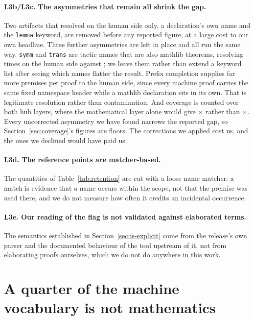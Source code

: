 \paragraph{L3b/L3c. The asymmetries that remain all shrink the gap.} Two
artifacts that resolved on the human side only, a declaration's own name
and the \texttt{lemma} keyword, are removed before any reported figure, at a
large cost to our own headline. Three further asymmetries are
left in place and all run the same way. \texttt{symm} and \texttt{trans} are
tactic names that are also mathlib theorems, resolving \symmTransHuman{} times
on the human side against
\symmTransMachine{}; we leave
them rather than extend a keyword list after seeing which names flatter the
result. Prefix completion supplies far more premises per proof to the human
side,
since every machine proof carries the same fixed namespace header while a
mathlib declaration sits in its own. That is legitimate resolution rather than
contamination. And coverage is counted over both hub layers, where the
mathematical layer alone would give \vocabRatioMathOnly{}$\times$ rather than
\vocabRatio{}$\times$. Every uncorrected asymmetry we have found narrows the
reported gap, so Section~\ref{sec:coverage}'s figures are floors. The
corrections we applied cost us, and the ones we declined would have paid us.

\paragraph{L3d. The reference points are matcher-based.} The quantities of
Table~\ref{tab:retention} are cut with a loose name matcher: a match is
evidence that a name occurs within the scope, not that the premise was used
there, and we do not measure how often it credits an incidental occurrence.

\paragraph{L3e. Our reading of the flag is not validated against elaborated
terms.} The semantics established in Section~\ref{sec:is-explicit} come from
the release's own parser and the documented behaviour of the tool upstream of
it, not from elaborating proofs ourselves, which we do not do anywhere in this
work.

\section{A quarter of the machine vocabulary is not mathematics}
\label{sec:layer-composition}

